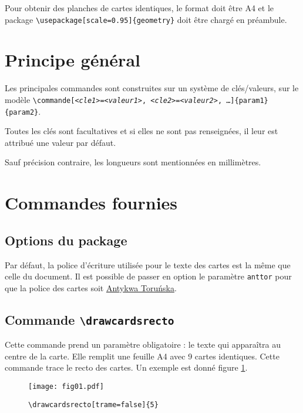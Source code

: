 \documentclass[a4paper, 12pt]{article}
\newcommand{\kv}[2]{\textit{<#1>}\texttt=\textit{<#2>}}
\newcommand{\commande}[1]{\texttt{\textbackslash#1}}
\begin{document}
Pour obtenir des planches de cartes identiques, le format doit être A4 et le package \commande{usepackage[scale=0.95]\{geometry\}} doit être chargé en préambule.

\section{Principe général}
Les principales commandes sont construites sur un système de clés/valeurs, sur le modèle \texttt{\textbackslash commande[\kv{cle1}{valeur1}, \kv{cle2}{valeur2}, …]\{param1\}\{param2\}}.

Toutes les clés sont facultatives et si elles ne sont pas renseignées, il leur est attribué une valeur par défaut.

Sauf précision contraire, les longueurs sont mentionnées en millimètres.

\section{Commandes fournies}
	\subsection{Options du package}
Par défaut, la police d'écriture utilisée pour le texte des cartes est la même que celle du document. Il est possible de passer en option le paramètre \texttt{anttor} pour que la police des cartes soit \href{https://tug.org/FontCatalogue/antykwatorunska/}{Antykwa Toruńska}.

	\subsection{Commande \commande{drawcardsrecto}}
Cette commande prend un paramètre obligatoire : le texte qui apparaîtra au centre de la carte. Elle remplit une feuille A4 avec 9 cartes identiques. Cette commande trace le recto des cartes. Un exemple est donné figure \ref{fig:recto}.
\begin{figure}[h]\begin{center}
	\caption{\commande{drawcardsrecto[trame=false]\{5\}}}
	\texttt{[image: fig01.pdf]}\label{fig:recto}
\end{center}\end{figure}
\end{document}
